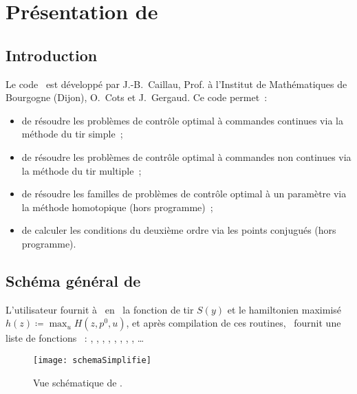 \section{Pr\'esentation de \hampath}

\subsection{Introduction}

Le code \hampath\ est d\'evelopp\'e par J.-B.~Caillau, Prof. \`a l'Institut de Math\'ematiques de Bourgogne (Dijon), O.~Cots et J.~Gergaud.
Ce code permet~:
\begin{itemize}
    \item de r\'esoudre les probl\`emes de contr\^ole optimal \`a commandes continues via la m\'ethode du tir simple~;
    \item de r\'esoudre les probl\`emes de contr\^ole optimal \`a commandes non continues via la m\'ethode du tir multiple~;
    \item de r\'esoudre les familles de probl\`emes de contr\^ole optimal \`a un param\`etre via la m\'ethode homotopique (hors programme)~;
    \item de calculer les conditions du deuxi\`eme ordre via les points conjugu\'es (hors programme).
\end{itemize}

\subsection{Sch\'ema g\'en\'eral de \hampath}

L'utilisateur fournit \`a \hampath\ en \fortran\ la fonction de tir $S(y)$ et le hamiltonien maximis\'e $h(z) \coloneqq \max_u H(z,p^0,u)$,
et apr\`es compilation de ces routines, \hampath\ fournit une liste de fonctions \matlab~: , , , , ,
, , , \ldots

\begin{figure}[ht!]
    \begin{center}
        \texttt{[image: schemaSimplifie]}
    \end{center}
    \caption{Vue sch\'ematique de \hampath.}
    \label{fig:schemaSimplifie}
\end{figure}

